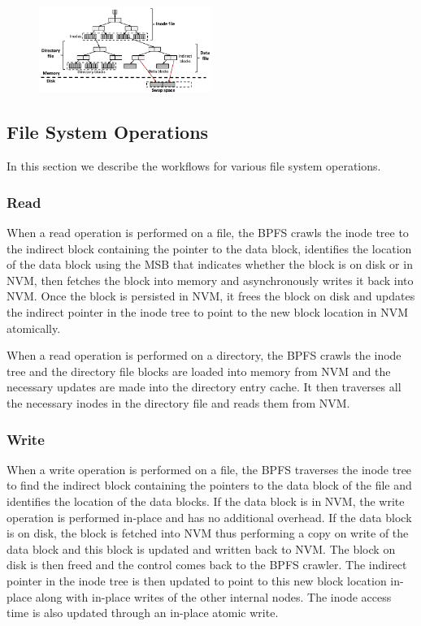 \begin{figure}
\centering
\vspace{-0.2in}
\includegraphics[width=0.5\textwidth]{figs/bpfs2.pdf}
\vspace{-0.2in}
\end{figure}

\subsection{File System Operations}
In this section we describe the workflows for various file system operations.
\subsubsection{Read}
When a read operation is performed on a file, the BPFS crawls the inode tree to the indirect block containing the pointer to the data block, identifies the location of the data block using the MSB that indicates whether the block is on disk or in NVM, then fetches the block into memory and asynchronously writes it back into NVM. Once the block is persisted in NVM, it frees the block on disk and updates the indirect pointer in the inode tree to point to the new block location in NVM atomically.

When a read operation is performed on a directory, the BPFS crawls the inode tree and the directory file blocks are loaded into memory from NVM and the necessary updates are made into the directory entry cache. It then traverses all the necessary inodes in the directory file and reads them from NVM.
 
\subsubsection{Write}
When a write operation is performed on a file, the BPFS traverses the inode tree to find the indirect block containing the pointers to the data block of the file and identifies the location of the data blocks. If the data block is in NVM, the write operation is performed in-place and has no additional overhead. If the data block is on disk, the block is fetched into NVM thus performing a copy on write of the data block and this block is updated and written back to NVM. The block on disk is then freed and the control comes back to the BPFS crawler. The indirect pointer in the inode tree is then updated to point to this new block location in-place along with in-place writes of the other internal nodes. The inode access time is also updated through an in-place atomic write.

